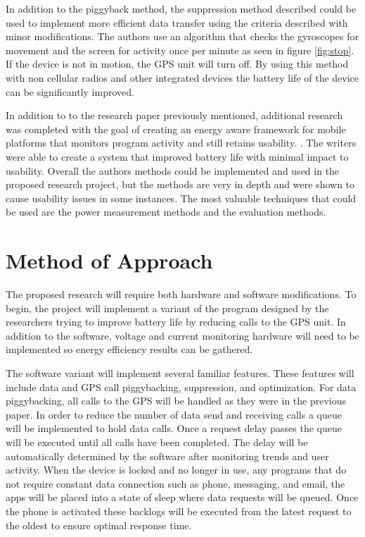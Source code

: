 \documentclass[11pt]{article}
\begin{document}
In addition to the piggyback method, the suppression method described could be used to implement more efficient data transfer using the criteria described with minor modifications. The authors use an algorithm that checks the gyroscopes for movement and the screen for activity once per minute as seen in figure \ref{fig:stop}. If the device is not in motion, the GPS unit will turn off. By using this method with non cellular radios and other integrated devices the battery life of the device can be significantly improved.

In addition to to the research paper previously mentioned, additional research was completed with the goal of creating an energy \-aware framework for mobile platforms that monitors program activity and still retains usability. \cite{Fei:2008:EFD:1347375.1347380}. The writers were able to create a system that improved battery life with minimal impact to usability. Overall the authors methods could be implemented and used in the proposed research project, but the methods are very in depth and were shown to cause usability issues in some instances. The most valuable techniques that could be used are the power measurement methods and the evaluation methods.

\vspace*{-.2in}
\section{Method of Approach}
\label{sec:method}
\vspace*{-.1in}

The proposed research will require both hardware and software modifications. To begin, the project will implement a variant of the program designed by the researchers trying to improve battery life by reducing calls to the GPS unit. In addition to the software, voltage and current monitoring hardware will need to be implemented so energy efficiency results can be gathered.

The software variant will implement several familiar features. These features will include data and GPS call piggybacking, suppression, and optimization. For data piggybacking, all calls to the GPS will be handled as they were in the previous paper. \cite{Zhuang:2010:IEE:1814433.1814464} In order to reduce the number of data send and receiving calls a queue will be implemented to hold data calls. Once a request delay passes the queue will be executed until all calls have been completed. The delay will be automatically determined by the software after monitoring trends and user activity. When the device is locked and no longer in use, any programs that do not require constant data connection such as phone, messaging, and email, the apps will be placed into a state of sleep where data requests will be queued. Once the phone is activated these backlogs will be executed from the latest request to the oldest to ensure optimal response time.
\end{document}
